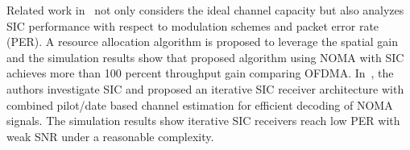 Related work in~\cite{cite_bell1} not only considers the ideal channel
capacity but also analyzes SIC performance with respect to modulation schemes
and packet error rate (PER). A resource allocation algorithm is proposed to
leverage the spatial gain and the simulation results show that
proposed algorithm using NOMA with SIC achieves more than 100 percent throughput
gain comparing OFDMA. In~\cite{cite_bell2}, the authors investigate SIC and
proposed an iterative SIC receiver architecture with combined pilot/date based
channel estimation for efficient decoding of NOMA signals. The simulation
results show iterative SIC receivers reach low PER with weak SNR under a
reasonable complexity.


